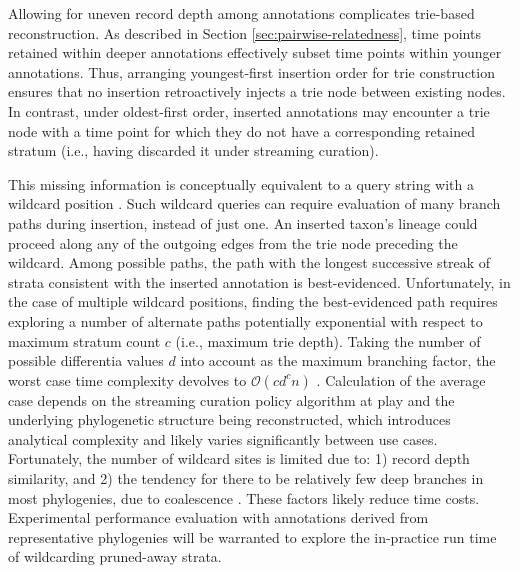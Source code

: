 Allowing for uneven record depth among annotations complicates trie-based reconstruction.
As described in Section \ref{sec:pairwise-relatedness}, time points retained within deeper annotations effectively subset time points within younger annotations.
Thus, arranging youngest-first insertion order for trie construction ensures that no insertion retroactively injects a trie node between existing nodes.
In contrast, under oldest-first order, inserted annotations may encounter a trie node with a time point for which they do not have a corresponding retained stratum (i.e., having discarded it under streaming curation).

This missing information is conceptually equivalent to a query string with a wildcard position \citep{fukuyama2016partial}.
Such wildcard queries can require evaluation of many branch paths during insertion, instead of just one.
An inserted taxon's lineage could proceed along any of the outgoing edges from the trie node preceding the wildcard.
Among possible paths, the path with the longest successive streak of strata consistent with the inserted annotation is best-evidenced.
Unfortunately, in the case of multiple wildcard positions, finding the best-evidenced path requires exploring a number of alternate paths potentially exponential with respect to maximum stratum count $c$ (i.e., maximum trie depth).
Taking the number of possible differentia values $d$ into account as the maximum branching factor, the worst case time complexity devolves to $\mathcal{O}(c d^c n)$ \citep{fukuyama2016partial}.
Calculation of the average case depends on the streaming curation policy algorithm at play and the underlying phylogenetic structure being reconstructed, which introduces analytical complexity and likely varies significantly between use cases.
Fortunately, the number of wildcard sites is limited due to: 1) record depth similarity, and 2) the tendency for there to be relatively few deep branches in most phylogenies, due to coalescence \citep{nordborgCoalescentTheory2019, berestyckiRecentProgressCoalescent2009}.
These factors likely reduce time costs.
Experimental performance evaluation with annotations derived from representative phylogenies will be warranted to explore the in-practice run time of wildcarding pruned-away strata.


